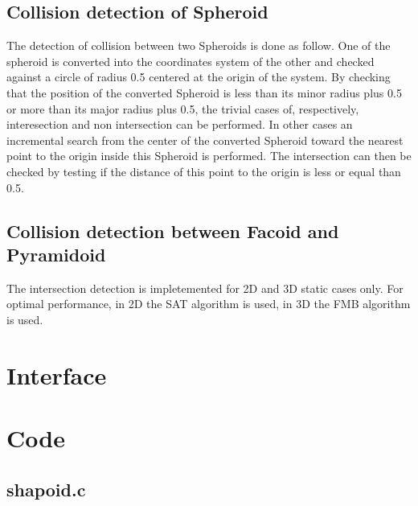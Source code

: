 \subsection{Collision detection of Spheroid}

The detection of collision between two Spheroids is done as follow. One of the spheroid is converted into the coordinates system of the other and checked against a circle of radius 0.5 centered at the origin of the system. By checking that the position of the converted Spheroid is less than its minor radius plus 0.5 or more than its major radius plus 0.5, the trivial cases of, respectively, interesection and non intersection can be performed. In other cases an incremental search from the center of the converted Spheroid toward the nearest point to the origin inside this Spheroid is performed. The intersection can then be checked by testing if the distance of this point to the origin is less or equal than 0.5.\\

\subsection{Collision detection between Facoid and Pyramidoid}

The intersection detection is impletemented for 2D and 3D static cases only. For optimal performance, in 2D the SAT algorithm is used, in 3D the FMB algorithm is used.

\section{Interface}

\begin{scriptsize}
\begin{ttfamily}

\end{ttfamily}
\end{scriptsize}

\section{Code}

\subsection{shapoid.c}

\begin{scriptsize}
\begin{ttfamily}

\end{ttfamily}
\end{scriptsize}

